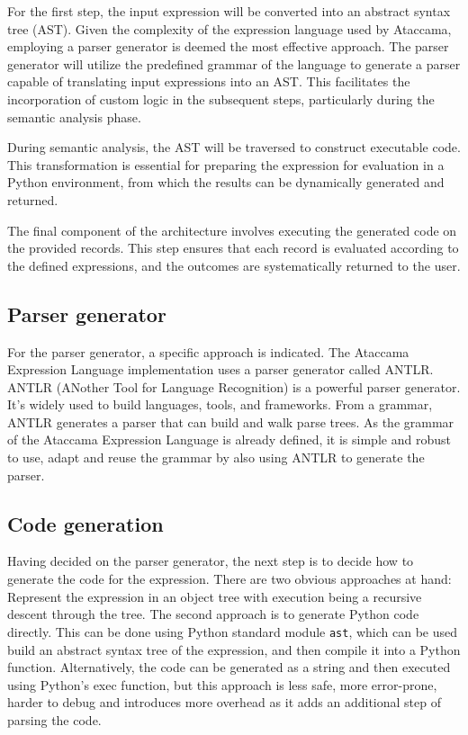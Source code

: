 For the first step, the input expression will be converted into an abstract syntax tree (AST). Given the complexity of the expression language used by Ataccama, employing a parser generator is deemed the most effective approach. The parser generator will utilize the predefined grammar of the language to generate a parser capable of translating input expressions into an AST. This facilitates the incorporation of custom logic in the subsequent steps, particularly during the semantic analysis phase.

During semantic analysis, the AST will be traversed to construct executable code. This transformation is essential for preparing the expression for evaluation in a Python environment, from which the results can be dynamically generated and returned.

The final component of the architecture involves executing the generated code on the provided records. This step ensures that each record is evaluated according to the defined expressions, and the outcomes are systematically returned to the user.

\subsection{Parser generator}

For the parser generator, a specific approach is indicated. The Ataccama Expression Language implementation uses a parser generator called ANTLR. ANTLR (ANother Tool for Language Recognition) is a powerful parser generator\cite{antlr}. It's widely used to build languages, tools, and frameworks. From a grammar, ANTLR generates a parser that can build and walk parse trees\cite{antlr4docs}. As the grammar of the Ataccama Expression Language is already defined, it is simple and robust to use, adapt and reuse the grammar by also using ANTLR to generate the parser. 

\subsection{Code generation}

Having decided on the parser generator, the next step is to decide how to generate the code for the expression. There are two obvious approaches at hand: Represent the expression in an object tree with execution being a recursive descent through the tree. The second approach is to generate Python code directly. This can be done using Python standard module \texttt{ast}, which can be used build an abstract syntax tree of the expression, and then compile it into a Python function. Alternatively, the code can be generated as a string and then executed using Python's exec function, but this approach is less safe, more error-prone, harder to debug and introduces more overhead as it adds an additional step of parsing the code.

